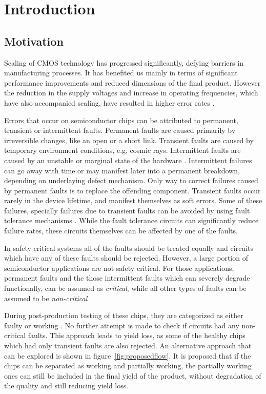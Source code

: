 \chapter{Introduction}

\section{Motivation}
Scaling of CMOS technology has progressed significantly, defying barriers in manufacturing processes. It has benefited us mainly in terms of significant performance improvements and reduced dimensions of the final product. However the reduction in the supply voltages and increase in operating frequencies, which have also accompanied scaling, have resulted in higher error rates \cite{Srinivasan2004, Constantinescu2007, Agostinelli2005}.

Errors that occur on semiconductor chips  can be attributed to permanent, transient or intermittent faults. Permanent faults are caused primarily by irreversible changes, like an open or a short link. Transient faults are caused by temporary environment conditions, e.g. cosmic rays. Intermittent faults are caused by an unstable or marginal state of the hardware \cite{Constantinescu2007}. Intermittent failures can go away with time or may manifest later into a permanent breakdown, depending on underlaying defect mechanism. Only way to correct failures caused by permanent faults is to replace the offending component.  Transient faults occur rarely in the device lifetime, and manifest themselves as soft errors. Some of these failures, specially  failures due to transient faults can be avoided by using fault tolerance mechanisms \cite{Bartlett2004, Mitra2008}. While the fault tolerance circuits can significantly reduce failure rates, these circuits themselves can be affected by one of the faults.

In safety critical systems all of the faults should be treated equally and circuits which have any of these faults should be rejected. However, a large portion of semiconductor applications are not safety critical. For those applications, permanent faults and the those intermittent faults which can severely degrade functionally, can be assumed as \emph{critical}, while all other types of faults can be assumed to be \emph{non-critical}

During post-production testing of these chips, they are categorized as either faulty or working \cite{Agrawal2000}. No further attempt is made to check if circuits had any non-critical faults. This approach leads to yield loss, as some of the healthy chips which had only transient faults are also rejected. An alternative approach that can be explored is shown in figure~\ref{fig:proposedflow}. It is proposed that if the chips can be separated as working and partially working, the partially working ones can still be included in the final yield of the product, without degradation of the quality and still reducing yield loss.

